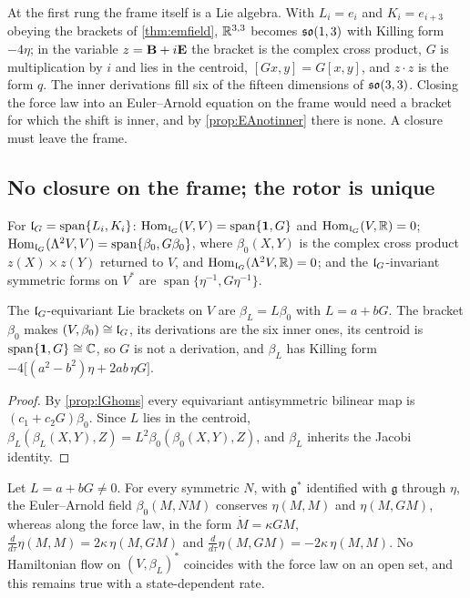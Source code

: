 At the first rung the frame itself is a Lie algebra. With $L_i=e_i$ and $K_i=e_{i+3}$ obeying the brackets of \cref{thm:emfield}, $\mathbb{R}^{3,3}$
becomes $\mathfrak{so}(1,3)$ with Killing form $-4\eta$; in the variable $z=\mathbf B+i\mathbf E$ the bracket is the complex cross product, $G$ is multiplication by $i$
and lies in the centroid, $[Gx,y]=G[x,y]$, and $z\cdot z$ is the form $q$. The inner derivations fill six of the fifteen dimensions of
$\mathfrak{so}(3,3)$. Closing the force law into an Euler--Arnold equation on the frame would need a bracket for which the shift is inner, and by
\cref{prop:EAnotinner} there is none. A closure must leave the frame.

\subsection{No closure on the frame; the rotor is unique}

\begin{proposition}
\label{prop:lGhoms}
For $\mathfrak l_G=\operatorname{span}\{L_i,K_i\}$: $\operatorname{Hom}_{\mathfrak l_G}(V,V)=\operatorname{span}\{\mathbf 1,G\}$ and $\operatorname{Hom}_{\mathfrak l_G}(V,\mathbb{R})=0$;
$\operatorname{Hom}_{\mathfrak l_G}(\Lambda^2V,V)=\operatorname{span}\{\beta_0,G\beta_0\}$, where $\beta_0(X,Y)$ is the complex cross product $z(X)\times z(Y)$ returned to
$V$, and $\operatorname{Hom}_{\mathfrak l_G}(\Lambda^2V,\mathbb{R})=0$; and the $\mathfrak l_G$-invariant symmetric forms on $V^*$ are $\operatorname{span}\{\eta^{-1},G\eta^{-1}\}$.
\end{proposition}

\begin{theorem}
\label{thm:brackets}
The $\mathfrak l_G$-equivariant Lie brackets on $V$ are $\beta_L=L\beta_0$ with $L=a+bG$. The bracket $\beta_0$ makes $(V,\beta_0)\cong\mathfrak l_G$, its derivations
are the six inner ones, its centroid is $\operatorname{span}\{\mathbf 1,G\}\cong\mathbb{C}$, so $G$ is not a derivation, and $\beta_L$ has Killing form
$-4\bigl[(a^2-b^2)\eta+2ab\,\eta G\bigr]$.
\end{theorem}

\begin{proof}
By \cref{prop:lGhoms} every equivariant antisymmetric bilinear map is $(c_1+c_2G)\beta_0$. Since $L$ lies in the centroid,
$\beta_L(\beta_L(X,Y),Z)=L^2\beta_0(\beta_0(X,Y),Z)$, and $\beta_L$ inherits the Jacobi identity.
\end{proof}

\begin{theorem}
\label{thm:noframe}
Let $L=a+bG\neq0$. For every symmetric $N$, with $\mathfrak g^*$ identified with $\mathfrak g$ through $\eta$, the Euler--Arnold field
$\beta_0(M,NM)$ conserves $\eta(M,M)$ and $\eta(M,GM)$, whereas along the force law, in the form $\dot M=\kappa GM$,
$\tfrac{d}{d\tau}\eta(M,M)=2\kappa\,\eta(M,GM)$ and $\tfrac{d}{d\tau}\eta(M,GM)=-2\kappa\,\eta(M,M)$. No Hamiltonian flow on $(V,\beta_L)^*$ coincides
with the force law on an open set, and this remains true with a state-dependent rate.
\end{theorem}

